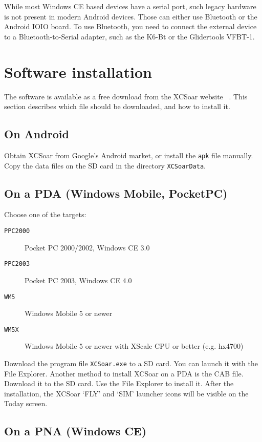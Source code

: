 While most Windows CE based devices have a serial port, such legacy
hardware is not present in modern Android devices.  Those can either
use Bluetooth or the Android IOIO board.  To use Bluetooth, you need
to connect the external device to a Bluetooth-to-Serial adapter, such
as the K6-Bt or the Glidertools VFBT-1.


\section{Software installation}

The software is available as a free download from the XCSoar website
~\xcsoarwebsite{}.  This section describes which file should be
downloaded, and how to install it.

\subsection*{On Android}

Obtain XCSoar from Google's Android market, or install the \verb|apk|
file manually.  Copy the data files on the SD card in the directory
\verb|XCSoarData|.

\subsection*{On a PDA (Windows Mobile, PocketPC)}

Choose one of the targets:

\begin{description}
\item[\texttt{PPC2000}] Pocket PC 2000/2002, Windows CE 3.0
\item[\texttt{PPC2003}] Pocket PC 2003, Windows CE 4.0
\item[\texttt{WM5}] Windows Mobile 5 or newer
\item[\texttt{WM5X}] Windows Mobile 5 or newer with XScale CPU or
  better (e.g. hx4700)
\end{description}

Download the program file \verb|XCSoar.exe| to a SD card.  You can
launch it with the File Explorer.
Another method to install XCSoar on a PDA is the CAB file.  Download
it to the SD card.  Use the File Explorer to install it.  After the
installation, the XCSoar `FLY' and `SIM' launcher icons will be
visible on the Today screen.


\subsection*{On a PNA (Windows CE)}


